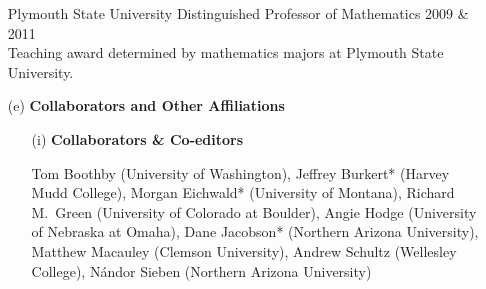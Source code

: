 \documentclass[11pt]{article}
\begin{document}
\begin{enumerate}[leftmargin=*]
\vspace{.25em}

%

%
 
Plymouth State University Distinguished Professor of Mathematics \hfill 2009 \& 2011\\
Teaching award determined by mathematics majors at Plymouth State University.

\item[(e)] \textbf{Collaborators and Other Affiliations} 
 
\begin{enumerate}[leftmargin=\parindent]
\item[(i)] \textbf{Collaborators \& Co-editors}

Tom Boothby (University of Washington), Jeffrey Burkert* (Harvey Mudd College), Morgan Eichwald* (University of Montana), Richard M.~Green (University of Colorado at Boulder), Angie Hodge (University of Nebraska at Omaha), Dane Jacobson* (Northern Arizona University), Matthew Macauley (Clemson University), Andrew Schultz (Wellesley College), N\'andor Sieben (Northern Arizona University)



\end{enumerate}
\end{enumerate}
\end{document}
